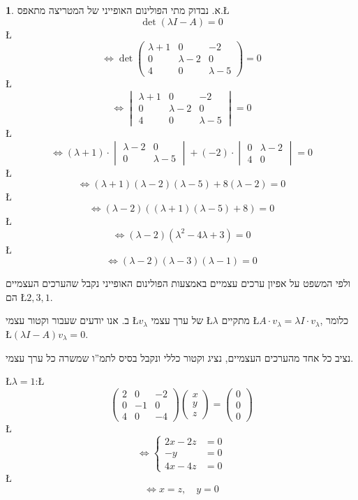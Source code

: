\documentclass[english,hebrew]{article}
\theoremstyle{definition}
\theoremstyle{definition}
\newtheorem*{sol*}{\protect\solutionname}
\providecommand{\solutionname}{פתרון}
\begin{document}
\begin{sol*}
א. נבדוק מתי הפולינום האופייני של המטריצה מתאפס.\L{%
\[
\det\left(\lambda I-A\right)=0
\]
}%
\L{%
\[
\iff\det\left(\begin{array}{ccc}
\lambda+1 & 0 & -2\\
0 & \lambda-2 & 0\\
4 & 0 & \lambda-5
\end{array}\right)=0
\]
}%
\L{%
\[
\iff\begin{vmatrix}\lambda+1 & 0 & -2\\
0 & \lambda-2 & 0\\
4 & 0 & \lambda-5
\end{vmatrix}=0
\]
}%
\L{%
\[
\iff\left(\lambda+1\right)\cdot\begin{vmatrix}\lambda-2 & 0\\
0 & \lambda-5
\end{vmatrix}+\left(-2\right)\cdot\begin{vmatrix}0 & \lambda-2\\
4 & 0
\end{vmatrix}=0
\]
}%
\L{%
\[
\iff\left(\lambda+1\right)\left(\lambda-2\right)\left(\lambda-5\right)+8\left(\lambda-2\right)=0
\]
}%
\L{%
\[
\iff\left(\lambda-2\right)\left(\left(\lambda+1\right)\left(\lambda-5\right)+8\right)=0
\]
}%
\L{%
\[
\iff\left(\lambda-2\right)\left(\lambda^{2}-4\lambda+3\right)=0
\]
}%
\L{%
\[
\iff\left(\lambda-2\right)\left(\lambda-3\right)\left(\lambda-1\right)=0
\]
}%

ולפי המשפט על אפיון ערכים עצמיים באמצעות הפולינום האופייני נקבל שהערכים
העצמיים הם \L{$2,3,1$}.

ב. אנו יודעים שעבור וקטור עצמי \L{$v_{\lambda}$} של ערך עצמי \L{$\lambda$}
מתקיים \L{$A\cdot v_{\lambda}=\lambda I\cdot v_{\lambda}$}, כלומר
\L{$\left(\lambda I-A\right)v_{\lambda}=0$}.

נציב כל אחד מהערכים העצמיים, נציג וקטור כללי ונקבל בסיס לתמ\textquotedblright ו
שמשרה כל ערך עצמי.

\L{$\lambda=1$}:\L{%
\[
\begin{pmatrix}2 & 0 & -2\\
0 & -1 & 0\\
4 & 0 & -4
\end{pmatrix}\begin{pmatrix}x\\
y\\
z
\end{pmatrix}=\begin{pmatrix}0\\
0\\
0
\end{pmatrix}
\]
}%
\L{%
\[
\iff\begin{cases}
2x-2z & =0\\
-y & =0\\
4x-4z & =0
\end{cases}
\]
}%
\L{%
\[
\iff x=z,\quad y=0
\]
}%


\end{sol*}
\end{document}

